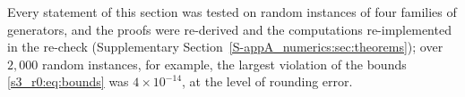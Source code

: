 Every statement of this section was tested on random instances of four families of generators, and the proofs
were re-derived and the computations re-implemented in the re-check (Supplementary
Section~\ref{S-appA_numerics:sec:theorems}); over $2{,}000$ random instances, for example, the largest violation
of the bounds \eqref{s3_r0:eq:bounds} was $4\times10^{-14}$, at the level of rounding error.

